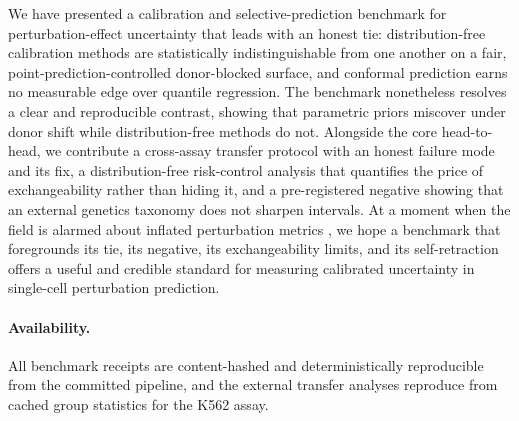 \documentclass{article}
\begin{document}
We have presented a calibration and selective-prediction benchmark for
perturbation-effect uncertainty that leads with an honest tie:
distribution-free calibration methods are statistically
indistinguishable from one another on a fair, point-prediction-controlled
donor-blocked surface, and conformal prediction earns no measurable edge
over quantile regression. The benchmark nonetheless resolves a clear and
reproducible contrast, showing that parametric priors miscover under
donor shift while distribution-free methods do not. Alongside the core
head-to-head, we contribute a cross-assay transfer protocol with an
honest failure mode and its fix, a distribution-free risk-control
analysis that quantifies the price of exchangeability rather than hiding
it, and a pre-registered negative showing that an external genetics
taxonomy does not sharpen intervals. At a moment when the field is
alarmed about inflated perturbation metrics
\citep{ahlmanneltze2025deep, wu2024perturbench}, we hope a benchmark that
foregrounds its tie, its negative, its exchangeability limits, and its
self-retraction offers a useful and credible standard for measuring
calibrated uncertainty in single-cell perturbation prediction.

\paragraph{Availability.} All benchmark receipts are content-hashed and
deterministically reproducible from the committed pipeline, and the
external transfer analyses reproduce from cached group statistics for the
K562 assay.



\end{document}
